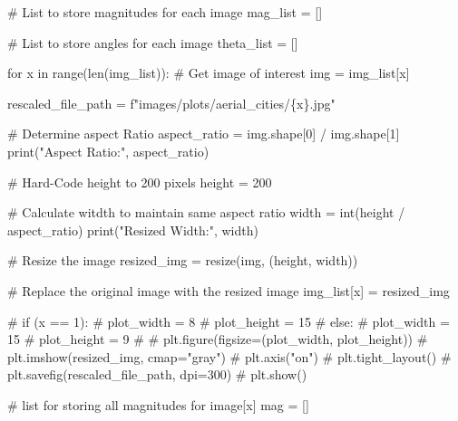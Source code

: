 \documentclass[
  letterpaper,
  DIV=11,
  numbers=noendperiod]{scrreprt}
\newenvironment{Shaded}{\begin{snugshade}}{\end{snugshade}}
\newcommand{\BuiltInTok}[1]{\textcolor[rgb]{0.00,0.23,0.31}{#1}}
\newcommand{\CommentTok}[1]{\textcolor[rgb]{0.37,0.37,0.37}{#1}}
\newcommand{\ControlFlowTok}[1]{\textcolor[rgb]{0.00,0.23,0.31}{#1}}
\newcommand{\DecValTok}[1]{\textcolor[rgb]{0.68,0.00,0.00}{#1}}
\newcommand{\KeywordTok}[1]{\textcolor[rgb]{0.00,0.23,0.31}{#1}}
\newcommand{\NormalTok}[1]{\textcolor[rgb]{0.00,0.23,0.31}{#1}}
\newcommand{\OperatorTok}[1]{\textcolor[rgb]{0.37,0.37,0.37}{#1}}
\newcommand{\SpecialCharTok}[1]{\textcolor[rgb]{0.37,0.37,0.37}{#1}}
\newcommand{\SpecialStringTok}[1]{\textcolor[rgb]{0.13,0.47,0.30}{#1}}
\newcommand{\StringTok}[1]{\textcolor[rgb]{0.13,0.47,0.30}{#1}}
\begin{document}
\begin{Shaded}
\begin{Highlighting}[]
\CommentTok{\# List to store magnitudes for each image}
\NormalTok{mag\_list }\OperatorTok{=}\NormalTok{ []}

\CommentTok{\# List to store angles for each image}
\NormalTok{theta\_list }\OperatorTok{=}\NormalTok{ []}


\ControlFlowTok{for}\NormalTok{ x }\KeywordTok{in} \BuiltInTok{range}\NormalTok{(}\BuiltInTok{len}\NormalTok{(img\_list)):}
    \CommentTok{\# Get image of interest}
\NormalTok{    img }\OperatorTok{=}\NormalTok{ img\_list[x]}
    
\NormalTok{    rescaled\_file\_path }\OperatorTok{=} \SpecialStringTok{f"images/plots/aerial\_cities/}\SpecialCharTok{\{}\NormalTok{x}\SpecialCharTok{\}}\SpecialStringTok{.jpg"}
    
    \CommentTok{\# Determine aspect Ratio}
\NormalTok{    aspect\_ratio }\OperatorTok{=}\NormalTok{ img.shape[}\DecValTok{0}\NormalTok{] }\OperatorTok{/}\NormalTok{ img.shape[}\DecValTok{1}\NormalTok{]}
    \BuiltInTok{print}\NormalTok{(}\StringTok{"Aspect Ratio:"}\NormalTok{, aspect\_ratio)}
    
    \CommentTok{\# Hard{-}Code height to 200 pixels}
\NormalTok{    height }\OperatorTok{=} \DecValTok{200}
    
    \CommentTok{\# Calculate witdth to maintain same aspect ratio}
\NormalTok{    width }\OperatorTok{=} \BuiltInTok{int}\NormalTok{(height }\OperatorTok{/}\NormalTok{ aspect\_ratio)}
    \BuiltInTok{print}\NormalTok{(}\StringTok{"Resized Width:"}\NormalTok{, width)}
    
    \CommentTok{\# Resize the image}
\NormalTok{    resized\_img }\OperatorTok{=}\NormalTok{ resize(img, (height, width))}
    
    \CommentTok{\# Replace the original image with the resized image}
\NormalTok{    img\_list[x] }\OperatorTok{=}\NormalTok{ resized\_img}
    
    \CommentTok{\# if (x == 1):}
    \CommentTok{\#   plot\_width = 8}
    \CommentTok{\#   plot\_height = 15}
    \CommentTok{\# else:}
    \CommentTok{\#   plot\_width = 15}
    \CommentTok{\#   plot\_height = 9}
    \CommentTok{\# }
    \CommentTok{\# plt.figure(figsize=(plot\_width, plot\_height))}
    \CommentTok{\# plt.imshow(resized\_img, cmap="gray")}
    \CommentTok{\# plt.axis("on")}
    \CommentTok{\# plt.tight\_layout()}
    \CommentTok{\# plt.savefig(rescaled\_file\_path, dpi=300)}
    \CommentTok{\# plt.show()}

    
    \CommentTok{\# list for storing all magnitudes for image[x]}
\NormalTok{    mag }\OperatorTok{=}\NormalTok{ []}
    

\end{Highlighting}
\end{Shaded}
\end{document}
